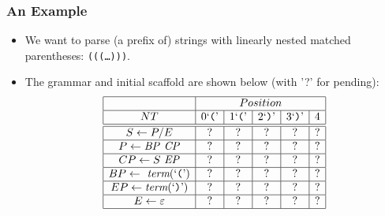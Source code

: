 \documentclass[xcolor=dvipsnames]{beamer}
\begin{document}
\begin{frame}[fragile]
\frametitle{An Example}
\begin{itemize}
\item   We want to parse (a prefix of) strings with linearly nested matched parentheses: \texttt{(((\ldots)))}.
\item   The grammar and initial scaffold are shown below (with '{?}' for pending):
$$
\begin{array}[c]{|c|c|c|c|c|c|}\hline
  & \multicolumn{5}{c|}{Position} \\\hline
NT  & 0 \mbox{\lq\texttt{(}\rq}& 1 \mbox{\lq\texttt{(}\rq}& 2 \mbox{\lq\texttt{)}\rq}& 3 \mbox{\lq\texttt{)}\rq} & 4 \\\hline\hline
S \leftarrow  P / E &  ? & ? & ? & ? & ? \\\hline
  P \leftarrow  \mathit{BP}~\mathit{CP}    &  ? & ? & ? & ? & ? \\\hline
  CP \leftarrow  S~\mathit{EP} &  ? & ? & ? & ? & ? \\\hline
  BP \leftarrow \textit{ term}(\mbox{\lq\texttt{(}\rq}) &  ? & ? & ? & ? & ? \\\hline
  EP \leftarrow  \textit{term}(\mbox{\lq\texttt{)}\rq}) &  ? & ? & ? & ? & ? \\\hline
  E \leftarrow  \varepsilon  & ? & ? & ? & ? & ? \\\hline    
\end{array}
$$
\end{itemize}
\end{frame}
\end{document}
